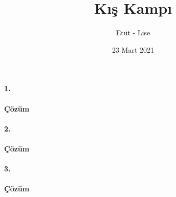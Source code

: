 \documentclass[12pt,a4paper]{article}
\title{Kış Kampı}
\author{Etüt - Lise}
\date{23 Mart 2021}
\begin{document}
\maketitle
\thispagestyle{empty}

\paragraph{1.} 

\paragraph{Çözüm} 


\newpage

\paragraph{2.} 

\paragraph{Çözüm} 

\newpage

\paragraph{3.} 

\paragraph{Çözüm}
\end{document}
